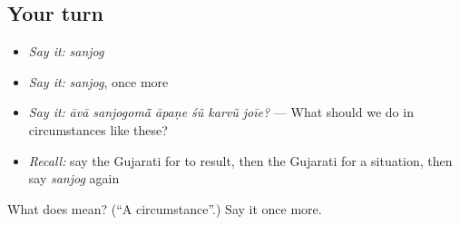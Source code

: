 \subsection*{Your turn}
\begin{itemize}
\raggedright
  \item \emph{Say it:} \emph{sanjog}
  \item \emph{Say it:} \emph{sanjog}, once more
  \item \emph{Say it:} \emph{āvā sanjogomā̃ āpaṇe śũ karvũ joīe?} — What should we do in circumstances like these?
  \item \emph{Recall:} say the Gujarati for to result, then the Gujarati for a situation, then say \emph{sanjog} again
\end{itemize}

\begin{tcolorbox}[breakable,colback=teal!4,colframe=teal!35!black,title={Before you move on}]
What does  mean? (\textquotedblleft{}A circumstance\textquotedblright{}.) Say it once more.
\end{tcolorbox}
